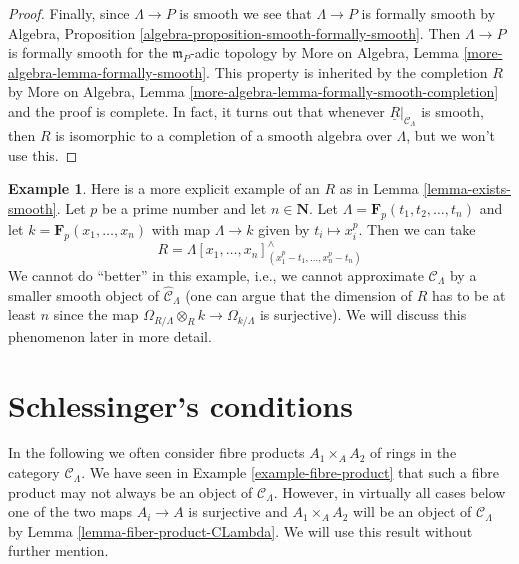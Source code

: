 \documentclass{stacks-project}
\theoremstyle{plain}
\theoremstyle{definition}
\newtheorem{example}[subsection]{Example}
\theoremstyle{remark}
\numberwithin{equation}{subsection}
\begin{document}
\begin{proof}
\medskip\noindent
Finally, since $\Lambda \to P$ is smooth we see that
$\Lambda \to P$ is formally smooth by
Algebra, Proposition \ref{algebra-proposition-smooth-formally-smooth}.
Then $\Lambda \to P$ is formally smooth for the $\mathfrak m_P$-adic
topology by More on Algebra, Lemma \ref{more-algebra-lemma-formally-smooth}.
This property is inherited by the completion $R$ by
More on Algebra, Lemma \ref{more-algebra-lemma-formally-smooth-completion}
and the proof is complete.
In fact, it turns out that whenever $\underline{R}|_{\mathcal{C}_\Lambda}$
is smooth, then $R$ is isomorphic to a completion of a smooth
algebra over $\Lambda$, but we won't use this.
\end{proof}

\begin{example}
\label{example-smooth-explicit}
Here is a more explicit example of an $R$ as in
Lemma \ref{lemma-exists-smooth}.
Let $p$ be a prime number and let $n \in \mathbf{N}$.
Let $\Lambda = \mathbf{F}_p(t_1, t_2, \ldots, t_n)$ and let
$k = \mathbf{F}_p(x_1, \ldots, x_n)$ with map $\Lambda \to k$ given
by $t_i \mapsto x_i^p$. Then we can take
$$
R = \Lambda[x_1, \ldots, x_n]^\wedge_{(x_1^p - t_1, \ldots, x_n^p - t_n)}
$$
We cannot do ``better'' in this example, i.e., we cannot approximate
$\mathcal{C}_\Lambda$ by a smaller smooth object of
$\widehat{\mathcal{C}}_\Lambda$ (one can argue that the dimension of $R$
has to be at least $n$ since the map
$\Omega_{R/\Lambda} \otimes_R k \to \Omega_{k/\Lambda}$ is
surjective). We will discuss this phenomenon later in more detail.
\end{example}







\section{Schlessinger's conditions}
\label{section-schlessinger-conditions}

\noindent
In the following we often consider fibre products $A_1 \times_A A_2$
of rings in the category $\mathcal{C}_\Lambda$. We have seen in
Example \ref{example-fibre-product}
that such a fibre product may not always be an object of
$\mathcal{C}_\Lambda$. However, in virtually all cases below one of the
two maps $A_i \to A$ is surjective and $A_1 \times_A A_2$ will be
an object of $\mathcal{C}_\Lambda$ by
Lemma \ref{lemma-fiber-product-CLambda}.
We will use this result without further mention.
\end{document}
